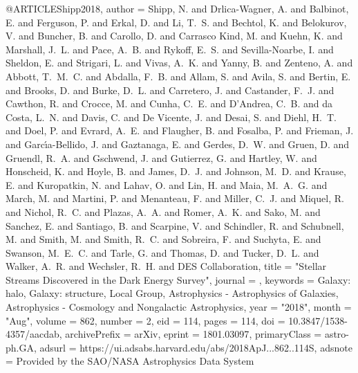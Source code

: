 \documentclass[apj]{emulateapj}
\begin{document}
{{{{{{{{{@ARTICLE{Shipp2018,
       author = {{Shipp}, N. and {Drlica-Wagner}, A. and {Balbinot}, E. and
         {Ferguson}, P. and {Erkal}, D. and {Li}, T.~S. and {Bechtol}, K. and
         {Belokurov}, V. and {Buncher}, B. and {Carollo}, D. and
         {Carrasco Kind}, M. and {Kuehn}, K. and {Marshall}, J.~L. and
         {Pace}, A.~B. and {Rykoff}, E.~S. and {Sevilla-Noarbe}, I. and
         {Sheldon}, E. and {Strigari}, L. and {Vivas}, A.~K. and {Yanny}, B. and
         {Zenteno}, A. and {Abbott}, T.~M.~C. and {Abdalla}, F.~B. and
         {Allam}, S. and {Avila}, S. and {Bertin}, E. and {Brooks}, D. and
         {Burke}, D.~L. and {Carretero}, J. and {Castander}, F.~J. and
         {Cawthon}, R. and {Crocce}, M. and {Cunha}, C.~E. and
         {D'Andrea}, C.~B. and {da Costa}, L.~N. and {Davis}, C. and
         {De Vicente}, J. and {Desai}, S. and {Diehl}, H.~T. and {Doel}, P. and
         {Evrard}, A.~E. and {Flaugher}, B. and {Fosalba}, P. and {Frieman}, J. and
         {Garc{\'\i}a-Bellido}, J. and {Gaztanaga}, E. and {Gerdes}, D.~W. and
         {Gruen}, D. and {Gruendl}, R.~A. and {Gschwend}, J. and
         {Gutierrez}, G. and {Hartley}, W. and {Honscheid}, K. and {Hoyle}, B. and
         {James}, D.~J. and {Johnson}, M.~D. and {Krause}, E. and
         {Kuropatkin}, N. and {Lahav}, O. and {Lin}, H. and {Maia}, M.~A.~G. and
         {March}, M. and {Martini}, P. and {Menanteau}, F. and {Miller}, C.~J. and
         {Miquel}, R. and {Nichol}, R.~C. and {Plazas}, A.~A. and
         {Romer}, A.~K. and {Sako}, M. and {Sanchez}, E. and {Santiago}, B. and
         {Scarpine}, V. and {Schindler}, R. and {Schubnell}, M. and {Smith}, M. and
         {Smith}, R.~C. and {Sobreira}, F. and {Suchyta}, E. and
         {Swanson}, M.~E.~C. and {Tarle}, G. and {Thomas}, D. and
         {Tucker}, D.~L. and {Walker}, A.~R. and {Wechsler}, R.~H. and
         {DES Collaboration}},
        title = "{Stellar Streams Discovered in the Dark Energy Survey}",
      journal = {\apj},
     keywords = {Galaxy: halo, Galaxy: structure, Local Group, Astrophysics - Astrophysics of Galaxies, Astrophysics - Cosmology and Nongalactic Astrophysics},
         year = "2018",
        month = "Aug",
       volume = {862},
       number = {2},
          eid = {114},
        pages = {114},
          doi = {10.3847/1538-4357/aacdab},
archivePrefix = {arXiv},
       eprint = {1801.03097},
 primaryClass = {astro-ph.GA},
       adsurl = {https://ui.adsabs.harvard.edu/abs/2018ApJ...862..114S},
      adsnote = {Provided by the SAO/NASA Astrophysics Data System}
}



}}}}}}}}}
\end{document}
